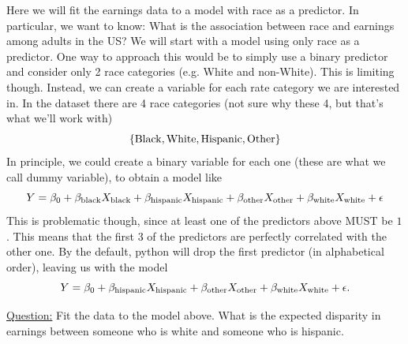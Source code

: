 \begin{example}
Here we will fit the earnings data to a model with race as a predictor. In particular, we want to know: What is the association between race and earnings among adults in the US?  We will start with a model using only race as a predictor. One way to approach this would be to simply use a binary predictor and consider only 2 race categories (e.g. White and non-White). This is limiting though. Instead, we can create a variable for each rate category we are interested in. In the dataset there are 4 race categories (not sure why these 4, but that's what we'll work with)
\begin{equation*}
\{{\rm Black},{\rm White},{\rm Hispanic},{\rm Other}\}
\end{equation*}
In principle, we could create a binary variable for each one (these are what we call dummy variable), to obtain a model like 
\begin{equation*}
Y = \beta_0 + \beta_{\rm black}X_{\rm black} + \beta_{\rm hispanic}X_{\rm hispanic}+ \beta_{\rm other }X_{\rm other}+ \beta_{\rm white}X_{\rm white} + \epsilon 
\end{equation*}
This is problematic though, since at least one of the predictors above MUST be $1$. This means that the first 3 of the predictors are perfectly correlated with the other one. By the default, python will drop the first predictor (in alphabetical order), leaving us with the model
\begin{equation*}
Y = \beta_0 + \beta_{\rm hispanic}X_{\rm hispanic}+ \beta_{\rm other }X_{\rm other}+ \beta_{\rm white}X_{\rm white} + \epsilon. \\
\end{equation*}

\noindent
\underline{Question:} Fit the data to the model above. What is the expected disparity in earnings between someone who is white and someone who is hispanic. \\


\end{example}
